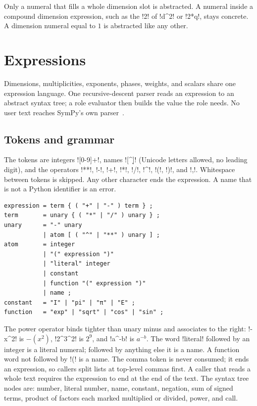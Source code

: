 Only a numeral that fills a whole dimension slot is abstracted. A numeral inside a compound dimension expression, such as the \code!2! of \code!d^2! or \code!2*q!, stays concrete. A dimension numeral equal to $1$ is abstracted like any other.

\section{Expressions}\label{sec:language-expr}

Dimensions, multiplicities, exponents, phases, weights, and scalars share one expression language. One recursive-descent parser reads an expression to an abstract syntax tree; a role evaluator then builds the value the role needs. No user text reaches SymPy's own parser~\cite{meurer2017sympy}.

\subsection{Tokens and grammar}

The tokens are integers \code![0-9]+!, names \code![^\W\d]\w*! (Unicode letters allowed, no leading digit), and the operators \code!**!, \code!-!, \code!+!, \code!*!, \code!/!, \code!^!, \code!(!, \code!)!, and \code!,!. Whitespace between tokens is skipped. Any other character ends the expression. A name that is not a Python identifier is an error.

\begin{lstlisting}[style=grammar,caption={Expression grammar.},label={lst:language-expr}]
expression = term { ( "+" | "-" ) term } ;
term       = unary { ( "*" | "/" ) unary } ;
unary      = "-" unary
           | atom [ ( "^" | "**" ) unary ] ;
atom       = integer
           | "(" expression ")"
           | "literal" integer
           | constant
           | function "(" expression ")"
           | name ;
constant   = "I" | "pi" | "π" | "E" ;
function   = "exp" | "sqrt" | "cos" | "sin" ;
\end{lstlisting}

The power operator binds tighter than unary minus and associates to the right: \code!-x^2! is $-(x^2)$, \code!2^3^2! is $2^{9}$, and \code!a^-b! is $a^{-b}$. The word \code!literal! followed by an integer is a literal numeral; followed by anything else it is a name. A function word not followed by \code!(! is a name. The comma token is never consumed; it ends an expression, so callers split lists at top-level commas first. A caller that reads a whole text requires the expression to end at the end of the text. The syntax tree nodes are: number, literal number, name, constant, negation, sum of signed terms, product of factors each marked multiplied or divided, power, and call.

